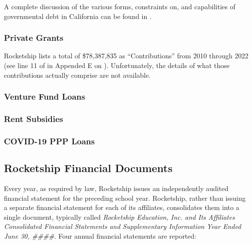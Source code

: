 A complete discussion of the various forms, constraints on, and capabilities of governmental debt in California can be found in  \parencite{CDIAC2023}.

\subsubsection{Private Grants}
\label{sec:private-grants}\indent%

Rocketship lists a total of \$78,387,835 as ``Contributions'' from 2010 through 2022 (see line 11 of  in Appended E on \pageref{tab:consolidated_activities}). Unfortunately, the details of what those contributions actually comprise are not available. 

\begin{comment}
  This sum likely understates the true value of private grants primariy due to the conversion of debt or loans into grants as seen in \prettyref{appx:debt_2010-22} on\~p.\pageref{appx:debt_2010-22}.
\end{comment}

\subsubsection{Venture Fund Loans}
\label{sec:venture-fund-loans}\indent%

\subsubsection{Rent Subsidies}
\label{sec:rent-subsidies}\indent%

\subsubsection{COVID-19 PPP Loans}
\label{sec:covid-19-ppp-loans}\indent%

\subsection{Rocketship Financial Documents}
\label{sec:rocketship-financial-docs}\indent%

Every year, as required by law, Rocketship issues an independently audited financial statement for the preceding school year. Rocketship, rather than issuing a separate financial statement for each of its affiliates, consolidates them into a single document, typically called \textit{Rocketship Education, Inc. and Its Affiliates Consolidated Financial Statements and Supplementary Information Year Ended June 30, \#\#\#\#}. Four annual financial statements are reported:

